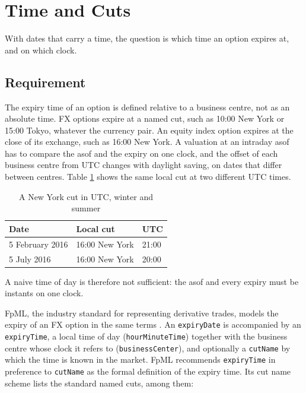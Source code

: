 \documentclass[12pt, a4paper]{article}
\begin{document}
\section{Time and Cuts}\label{sec:timezones}

With dates that carry a time, the question is which time an option expires at, and on which clock.

\subsection{Requirement}

The expiry time of an option is defined relative to a business centre, not as an absolute time. FX options expire at a
named cut, such as 10:00 New York or 15:00 Tokyo, whatever the currency pair. An equity index option expires at the
close of its exchange, such as 16:00 New York. A valuation at an intraday asof has to compare the asof and the expiry on
one clock, and the offset of each business centre from UTC changes with daylight saving, on dates that differ between
centres. Table \ref{tab:nycut} shows the same local cut at two different UTC times.

\begin{table}[hbt]
\centering
\begin{tabular}{|l|l|l|}
\hline
Date & Local cut & UTC \\
\hline
5 February 2016 & 16:00 New York & 21:00 \\
5 July 2016 & 16:00 New York & 20:00 \\
\hline
\end{tabular}
\caption{A New York cut in UTC, winter and summer}
\label{tab:nycut}
\end{table}

A naive time of day is therefore not sufficient: the asof and every expiry must be instants on one clock.

FpML, the industry standard for representing derivative trades, models the expiry of an FX option in the same terms
\cite{fpmlfxexercise}. An \texttt{expiryDate} is accompanied by an \texttt{expiryTime}, a local time of day
(\texttt{hourMinuteTime}) together with the business centre whose clock it refers to (\texttt{businessCenter}), and
optionally a \texttt{cutName} by which the time is known in the market. FpML recommends \texttt{expiryTime} in
preference to \texttt{cutName} as the formal definition of the expiry time. Its cut name scheme \cite{fpmlcutname}
lists the standard named cuts, among them:
\end{document}
